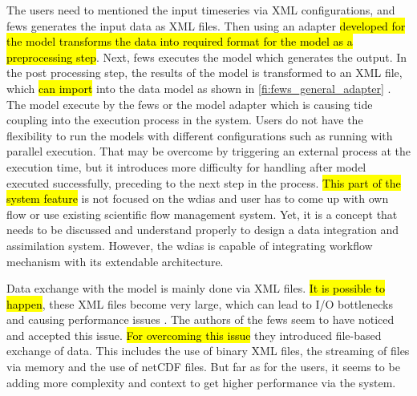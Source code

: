 The users need to mentioned the input timeseries via XML configurations, and \acrshort{fews} generates the input data as XML files. Then using an adapter \hl{developed for the model transforms the data into required format for the model as a preprocessing step}. Next, \acrshort{fews} executes the model which generates the output. In the post processing step, the results of the model is transformed to an XML file, which \hl{can import} into the data model as shown in \cref{fi:fews_general_adapter} \cite{Werner2013TheSystem}. %
The model execute by the \acrshort{fews} or the model adapter which is causing tide coupling into the execution process in the system. Users do not have the flexibility to run the models with different configurations such as running with parallel execution. That may be overcome by triggering an external process at the execution time, but it introduces more difficulty for handling after model executed successfully, preceding to the next step in the process. \hl{This part of the system feature} is not focused on the \acrshort{wdias} and user has to come up with own flow or use existing scientific flow management system. Yet, it is a concept that needs to be discussed and understand properly to design a data integration and assimilation system. However, the \acrshort{wdias} is capable of integrating workflow mechanism with its extendable architecture.

Data exchange with the model is mainly done via XML files. \hl{It is possible to happen}, these XML files become very large, which can lead to I/O bottlenecks and causing performance issues \cite{Werner2013TheSystem}. %
The authors of the \acrshort{fews} \cite{Werner2013TheSystem} seem to have noticed and accepted this issue. %
\hl{For overcoming this issue} they introduced file-based exchange of data. This includes the use of binary XML files, the streaming of files via memory and the use of \acrshort{netCDF} files. But far as for the users, it seems to be adding more complexity and context to get higher performance via the system.

